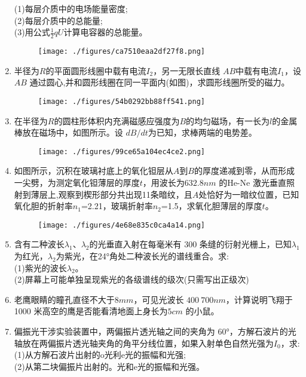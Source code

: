 \begin{enumerate}
(1)每层介质中的电场能量密度;\\
(2)每层介质中的总能量;\\
(3)用公式$\frac{1}{2}qU$计算电容器的总能量。
\begin{figure}[ht]
\centering
\texttt{[image: ./figures/ca7510eaa2df27f8.png]}
\caption{} \label{fig_SD05_5}
\end{figure}
\item 半径为$R$的平面圆形线圈中载有电流$I_2$，另一无限长直线 $AB $中载有电流$I_1$，设 $AB$ 通过圆心,并和圆形线圈在同一平面内(如图)，求圆形线圈所受的磁力。
\begin{figure}[ht]
\centering
\texttt{[image: ./figures/54b0292bb88ff541.png]}
\caption{} \label{fig_SD05_6}
\end{figure}
\item 在半径为$R$的圆柱形体积内充满磁感应强度为$B$的均匀磁场，有一长为$l$的金属棒放在磁场中，如图所示。设 $dB/dt $为已知，求棒两端的电势差。
\begin{figure}[ht]
\centering
\texttt{[image: ./figures/99ce65a104ec4ce2.png]}
\caption{} \label{fig_SD05_7}
\end{figure}
\item 如图所示，沉积在玻璃衬底上的氧化钽层从$A$到$B$的厚度递减到零，从而形成一尖劈，为测定氧化钽薄层的厚度$t$，用波长为$632.8nm$ 的He-Ne 激光垂直照射到薄层上,观察到楔形部分共出现11条暗纹，且$A$处恰好为一暗纹位置，已知氧化胆的折射率$n_1$=2.21，玻璃折射率$n_2$=1.5，求氧化胆薄层的厚度$t$。
\begin{figure}[ht]
\centering
\texttt{[image: ./figures/4e68e835c0ca4a14.png]}
\caption{} \label{fig_SD05_8}
\end{figure}
\item 含有二种波长$\lambda_1$、$\lambda_2$的光垂直入射在每毫米有 300 条缝的衍射光栅上，已知$\lambda_1$为红光，$\lambda_2$为紫光，在24°角处二种波长光的谱线重合。求:\\
(1)紫光的波长$\lambda_2$。\\
(2)屏幕上可能单独呈现紫光的各级谱线的级次(只需写出正级次)
\item 老鹰眼睛的瞳孔直径不大于$ 8mm$，可见光波长 $400~700nm$，计算说明飞翔于 1000 米高空的鹰是否能看清地面上身长为$5cm$ 的小鼠。
\item 偏振光干涉实验装置中，两偏振片透光轴之间的夹角为 60°，方解石波片的光轴放在两偏振片透光轴夹角的角平分线位置，如果入射单色自然光强为$I_0$，求:\\
(1)从方解石波片出射的o光利e光的振幅和光强;\\
(2)从第二块偏振片出射的。光和e光的振幅和光强。
\end{enumerate}
